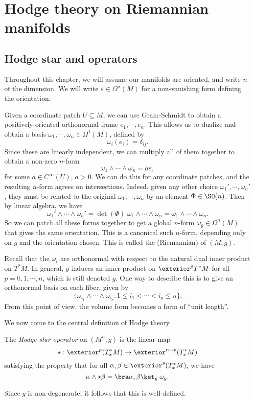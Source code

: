 \documentclass[a4paper]{article}
\begin{document}
\section{Hodge theory on Riemannian manifolds}
\subsection{Hodge star and operators}
Throughout this chapter, we will assume our manifolds are oriented, and write $n$ of the dimension. We will write $\varepsilon \in \Omega^n(M)$ for a non-vanishing form defining the orientation.

Given a coordinate patch $U \subseteq M$, we can use Gram-Schmidt to obtain a positively-oriented orthonormal frame $e_1, \cdots, e_n$. This allows us to dualize and obtain a basis $\omega_1, \cdots, \omega_n \in \Omega^1(M)$, defined by
\[
  \omega_i(e_i) = \delta_{ij}.
\]
Since these are linearly independent, we can multiply all of them together to obtain a non-zero $n$-form
\[
  \omega_1 \wedge \cdots \wedge \omega_n = a \varepsilon,
\]
for some $a \in C^\infty(U)$, $a > 0$. We can do this for any coordinate patches, and the resulting $n$-form agrees on intersections. Indeed, given any other choice $\omega_1', \cdots, \omega_n'$, they must be related to the original $\omega_1, \cdots, \omega_n$ by an element $\Phi \in \SO(n)$. Then by linear algebra, we have
\[
  \omega_1' \wedge \cdots \wedge \omega_n' = \det (\Phi)\; \omega_1 \wedge \cdots \wedge \omega_n = \omega_1 \wedge \cdots \wedge \omega_n.
\]
So we can patch all these forms together to get a global $n$-form $\omega_g \in \Omega^n(M)$ that gives the same orientation. This is a canonical such $n$-form, depending only on $g$ and the orientation chosen. This is called the (Riemannian)  of $(M, g)$.

Recall that the $\omega_i$ are orthonormal with respect to the natural dual inner product on $T^* M$. In general, $g$ induces an inner product on $\exterior^p T^* M$ for all $p = 0, 1, \cdots, n$, which is still denoted $g$. One way to describe this is to give an orthonormal basis on each fiber, given by
\[
  \{\omega_{i_1} \wedge \cdots \wedge \omega_{i_p} : 1 \leq i_1 < \cdots < i_p \leq n\}.
\]
From this point of view, the volume form becomes a form of ``unit length''.

We now come to the central definition of Hodge theory.
\begin{defi}
  The \emph{Hodge star operator} on $(M^n, g)$ is the linear map
  \[
    \star: \exterior^p (T^*_x M) \to \exterior^{n - p} (T_x^* M)
  \]
  satisfying the property that for all $\alpha, \beta \in \exterior^p (T_x^* M)$, we have
  \[
    \alpha \wedge \star\beta = \bra \alpha, \beta\ket_g\;\omega_g.
  \]
\end{defi}
Since $g$ is non-degenerate, it follows that this is well-defined.
\end{document}
